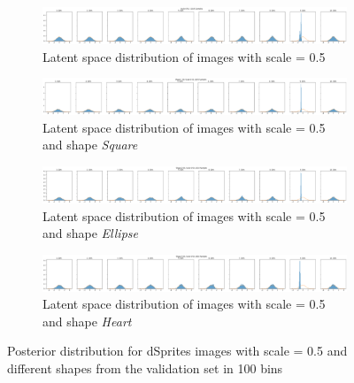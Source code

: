 \documentclass{beamer}
\begin{document}
\begin{frame}
\begin{figure}
\centering
\begin{subfigure}{\textwidth}
\centering
\includegraphics[width=\textwidth]{images/latent_space_entanglement/vae_dsprites_lf_10000_dist_scale_0_5.png}
\caption{Latent space distribution of images with scale = 0.5}
\end{subfigure}
\begin{subfigure}{\textwidth}
\centering
\includegraphics[width=\textwidth]{images/latent_space_entanglement/vae_dsprites_lf_10000_dist_shape_1_scale_0_5.png}
\caption{Latent space distribution of images with scale = 0.5 and shape \textit{Square}}
\end{subfigure}
\begin{subfigure}{\textwidth}
\centering
\includegraphics[width=\textwidth]{images/latent_space_entanglement/vae_dsprites_lf_10000_dist_shape_2_scale_0_5.png}
\caption{Latent space distribution of images with scale = 0.5 and shape \textit{Ellipse}}
\end{subfigure}
\begin{subfigure}{\textwidth}
\centering
\includegraphics[width=\textwidth]{images/latent_space_entanglement/vae_dsprites_lf_10000_dist_shape_3_scale_0_5.png}
\caption{Latent space distribution of images with scale = 0.5 and shape \textit{Heart}}
\end{subfigure}
\caption[VAE Latent Space Distribution - dSprites Scale and Shapes]{Posterior distribution for dSprites images with scale = 0.5 and different shapes from the validation set in 100 bins}
\end{figure}
\end{frame}
\end{document}
